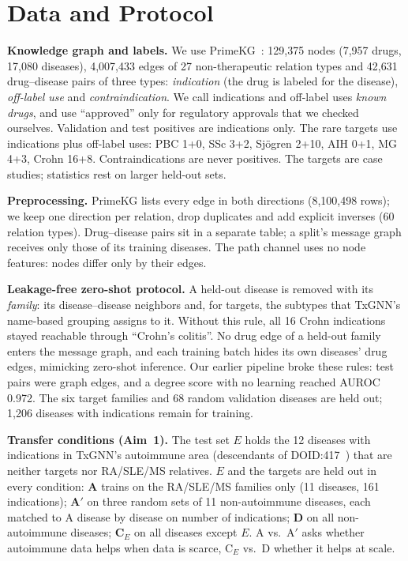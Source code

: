 \documentclass{svproc}
\begin{document}
\section{Data and Protocol}
\textbf{Knowledge graph and labels.} We use PrimeKG~\citep{chandak2023primekg}: 129,375 nodes (7,957 drugs, 17,080 diseases), 4,007,433 edges of 27 non-therapeutic relation types and 42,631 drug--disease pairs of three types: \emph{indication} (the drug is labeled for the disease), \emph{off-label use} and \emph{contraindication}. We call indications and off-label uses \emph{known drugs}, and use ``approved'' only for regulatory approvals that we checked ourselves. Validation and test positives are indications only. The rare targets use indications plus off-label uses: PBC 1+0, SSc 3+2, Sj\"ogren 2+10, AIH 0+1, MG 4+3, Crohn 16+8. Contraindications are never positives. The targets are case studies; statistics rest on larger held-out sets.

\textbf{Preprocessing.} PrimeKG lists every edge in both directions (8,100,498 rows); we keep one direction per relation, drop duplicates and add explicit inverses (60 relation types). Drug--disease pairs sit in a separate table; a split's message graph receives only those of its training diseases. The path channel uses no node features: nodes differ only by their edges.

\textbf{Leakage-free zero-shot protocol.} A held-out disease is removed with its \emph{family}: its disease--disease neighbors and, for targets, the subtypes that TxGNN's name-based grouping assigns to it. Without this rule, all 16 Crohn indications stayed reachable through ``Crohn's colitis''. No drug edge of a held-out family enters the message graph, and each training batch hides its own diseases' drug edges, mimicking zero-shot inference. Our earlier pipeline broke these rules: test pairs were graph edges, and a degree score with no learning reached AUROC 0.972. The six target families and 68 random validation diseases are held out; 1,206 diseases with indications remain for training.

\textbf{Transfer conditions (Aim~1).} The test set $E$ holds the 12 diseases with indications in TxGNN's autoimmune area (descendants of DOID:417~\citep{huang2024txgnn}) that are neither targets nor RA/SLE/MS relatives. $E$ and the targets are held out in every condition: \textbf{A} trains on the RA/SLE/MS families only (11 diseases, 161 indications); \textbf{A$'$} on three random sets of 11 non-autoimmune diseases, each matched to A disease by disease on number of indications; \textbf{D} on all \TrDNTrain{} non-autoimmune diseases; \textbf{C$_E$} on all \TrCENTrain{} diseases except $E$. A vs.\ A$'$ asks whether autoimmune data helps when data is scarce, C$_E$ vs.\ D whether it helps at scale.
\end{document}
